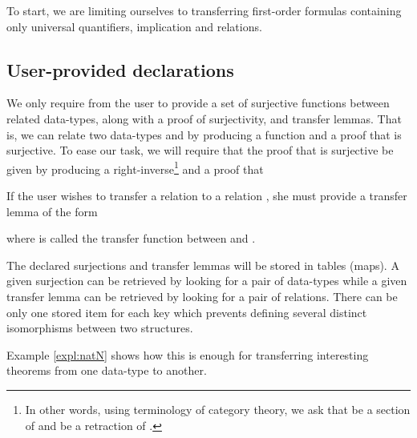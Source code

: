 \documentclass{llncs}
\begin{document}
To start, we are limiting ourselves to transferring first-order formulas containing only universal quantifiers,
implication and relations.

\subsection{User-provided declarations}

We only require from the user to provide a set of surjective functions between related data-types,
along with a proof of surjectivity, and transfer lemmas.
That is, we can relate two data-types  and  by producing a function 
and a proof that  is surjective.
To ease our task, we will require that the proof that  is surjective be given by producing a
right-inverse\footnote{In other words, using
terminology of category theory, we ask
that  be a section of  and  be a retraction of .}  and a proof that

If the user wishes to transfer a relation  to a relation
, she must provide a transfer lemma of the
form

where  is called the transfer function between  and .

The declared surjections and transfer lemmas will be stored in tables (maps).
A given surjection can be retrieved by looking for a pair of data-types while a given transfer
lemma can be retrieved by looking for a pair of relations.
There can be only one stored item for each key which prevents defining several distinct isomorphisms
between two structures.

Example \ref{expl:natN} shows how this is enough for transferring interesting theorems from one
data-type to another.
\end{document}

